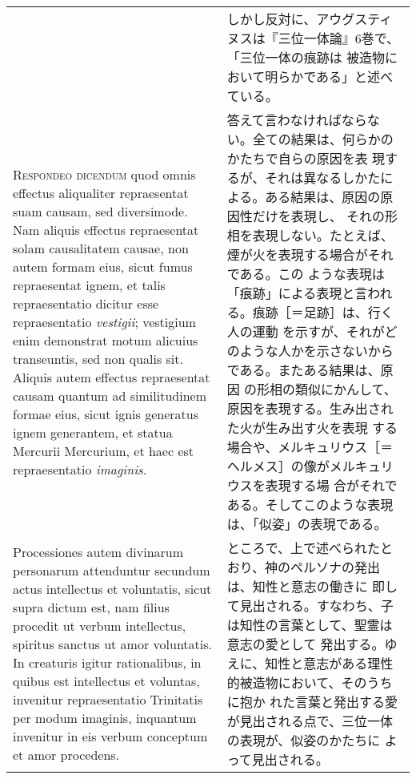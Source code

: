 \documentclass[10pt]{jsarticle} %
\begin{document}
\begin{longtable}{p{21em}p{21em}}
&
しかし反対に、アウグスティヌスは『三位一体論』6巻で、「三位一体の痕跡は
 被造物において明らかである」と述べている。

\\



{\scshape Respondeo dicendum} quod omnis effectus
 aliqualiter repraesentat suam causam, sed diversimode. Nam aliquis
 effectus repraesentat solam causalitatem causae, non autem formam eius,
 sicut fumus repraesentat ignem, et talis repraesentatio dicitur esse
 repraesentatio {\itshape vestigii}; vestigium enim demonstrat motum alicuius
 transeuntis, sed non qualis sit. Aliquis autem effectus repraesentat
 causam quantum ad similitudinem formae eius, sicut ignis generatus
 ignem generantem, et statua Mercurii Mercurium, et haec est
 repraesentatio {\itshape imaginis}. 

&

答えて言わなければならない。全ての結果は、何らかのかたちで自らの原因を表
現するが、それは異なるしかたによる。ある結果は、原因の原因性だけを表現し、
それの形相を表現しない。たとえば、煙が火を表現する場合がそれである。この
ような表現は「痕跡」による表現と言われる。痕跡［＝足跡］は、行く人の運動
を示すが、それがどのような人かを示さないからである。またある結果は、原因
の形相の類似にかんして、原因を表現する。生み出された火が生み出す火を表現
する場合や、メルキュリウス［＝ヘルメス］の像がメルキュリウスを表現する場
合がそれである。そしてこのような表現は、「似姿」の表現である。

\\


Processiones autem divinarum personarum
 attenduntur secundum actus intellectus et voluntatis, sicut supra
 dictum est, nam filius procedit ut verbum intellectus, spiritus sanctus
 ut amor voluntatis. In creaturis igitur rationalibus, in quibus est
 intellectus et voluntas, invenitur repraesentatio Trinitatis per modum
 imaginis, inquantum invenitur in eis verbum conceptum et amor
 procedens. 

&

ところで、上で述べられたとおり、神のペルソナの発出は、知性と意志の働きに
 即して見出される。すなわち、子は知性の言葉として、聖霊は意志の愛として
 発出する。ゆえに、知性と意志がある理性的被造物において、そのうちに抱か
 れた言葉と発出する愛が見出される点で、三位一体の表現が、似姿のかたちに
 よって見出される。

\\


\end{longtable}
\end{document}
